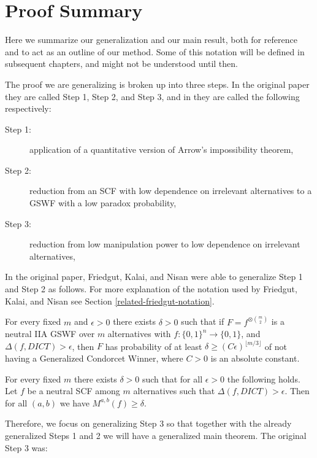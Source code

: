 \section {Proof Summary}

	Here we summarize our generalization and our main result, both for reference and to act as an outline of our method. Some of this notation will be defined in subsequent chapters, and might not be understood until then.

	The proof we are generalizing is broken up into three steps. In the original paper they are called Step 1, Step 2, and Step 3, and in \cite{friedgut2011quantitative} they are called the following respectively:
	\begin{description}
		\item[Step 1:] application of a quantitative version of Arrow's impossibility theorem,
		\item[Step 2:] reduction from an SCF with low dependence on irrelevant alternatives to a GSWF with a low paradox probability,
		\item[Step 3:] reduction from low manipulation power to low dependence on irrelevant alternatives,
	\end{description}

	In the original paper, Friedgut, Kalai, and Nisan were able to generalize Step 1 and Step 2 as follows. For more explanation of the notation used by Friedgut, Kalai, and Nisan see Section \ref{related-friedgut-notation}.

	\begin{lemma}
		For every fixed $m$ and $\epsilon > 0$ there exists $\delta > 0$ such that if $F = f^{\otimes \binom{m}{2}}$ is a neutral IIA GSWF over $m$ alternatives with $f : \{0,1\}^n \rightarrow \{0,1\}$, and $\Delta(f, DICT) > \epsilon$, then $F$ has probability of at least $\delta \ge (C\epsilon)^{\lfloor m/3 \rfloor}$ of not having a Generalized Condorcet Winner, where $C > 0$ is an absolute constant.
	\end{lemma}

	\begin{lemma}
		For every fixed $m$ there exists $\delta > 0$ such that for all $\epsilon > 0$ the following holds. Let $f$ be a neutral SCF among $m$ alternatives such that $\Delta(f, DICT) > \epsilon$. Then for all $(a,b)$ we have $M^{a,b}(f) \ge \delta$.
	\end{lemma}

	Therefore, we focus on generalizing Step 3 so that together with the already generalized Steps 1 and 2 we will have a generalized main theorem. The original Step 3 was:

